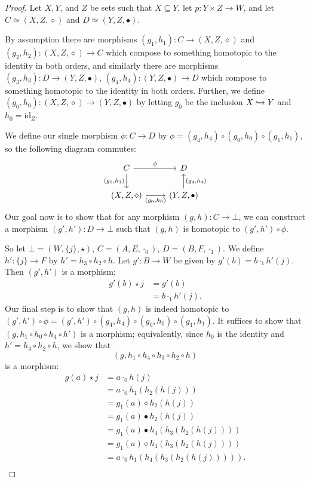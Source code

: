 \documentclass{article}
\begin{document}
\begin{proof}
Let $X, Y$, and $Z$ be sets such that $X \subseteq Y$, let $p: Y \times Z \to W$, and let $C \simeq (X, Z, \diamond)$ and $D \simeq (Y, Z, \bullet)$.

By assumption there are morphisms $(g_1, h_1): C \to (X, Z, \diamond)$ and $(g_2, h_2) : (X, Z, \diamond) \to C$ which compose to something homotopic to the identity in both orders, and similarly there are morphisms $(g_3, h_3) : D \to (Y, Z, \bullet)$, $(g_4, h_4) : (Y, Z, \bullet) \to D$ which compose to something homotopic to the identity in both orders.
Further, we define $(g_0, h_0) : (X, Z, \diamond) \to (Y, Z, \bullet)$ by letting $g_0$ be the inclusion $X \xhookrightarrow{} Y$ and $h_0 = \text{id}_Z$.

We define our single morphism $\phi : C \to D$ by $\phi = (g_4, h_4) \circ (g_0, h_0) \circ (g_1, h_1)$, so the following diagram commutes:
\[
\begin{tikzcd}
C \arrow[r, "\phi"] \arrow[d, "{(g_1, h_1)}"'] & D                                            \\
{(X, Z, \diamond)} \arrow[r, "{(g_0, h_0)}"']  & {(Y, Z, \bullet)} \arrow[u, "{(g_4, h_4)}"']
\end{tikzcd}
\]
Our goal now is to show that for any morphism $(g, h): C \to \bot$, we can construct a morphism $(g', h') : D \to \bot$ such that $(g, h)$ is homotopic to $(g', h') \circ \phi$.

So let $\bot = (W, \{j\}, \star)$, $C = (A, E, \cdot_0)$, $D = (B, F, \cdot_1)$.
We define $h': \{j\} \to F$ by $h' = h_3 \circ h_2 \circ h$.
Let $g': B \to W$ be given by $g'(b) = b \cdot_1 h'(j)$.
Then $(g', h')$ is a morphism:
\[
\begin{split}
    g'(b) \star j & = g'(b) \\
                  & = b \cdot_1 h'(j). 
\end{split}
\]
Our final step is to show that $(g, h)$ is indeed homotopic to $(g', h') \circ \phi = (g', h') \circ (g_4, h_4) \circ (g_0, h_0) \circ (g_1, h_1)$.
It suffices to show that $(g, h_1 \circ h_0 \circ h_4 \circ h')$ is a morphism;
equivalently, since $h_0$ is the identity and $h' = h_3 \circ h_2 \circ h$, we show that
\[
(g, h_1 \circ h_4 \circ h_3 \circ h_2 \circ h)
\]
is a morphism:
\[
\begin{split}
    g(a) \star j & = a \cdot_0 h(j) \\
                 & = a \cdot_0 h_1(h_2(h(j))) \\
                 & = g_1(a) \diamond h_2(h(j)) \\
                 & = g_1(a) \bullet h_2(h(j)) \\
                 & = g_1(a) \bullet h_4(h_3(h_2(h(j)))) \\
                 & = g_1(a) \diamond h_4(h_3(h_2(h(j)))) \\
                 & = a \cdot_0 h_1(h_4(h_3(h_2(h(j))))). \\
\end{split}
\]
\end{proof}
\end{document}
